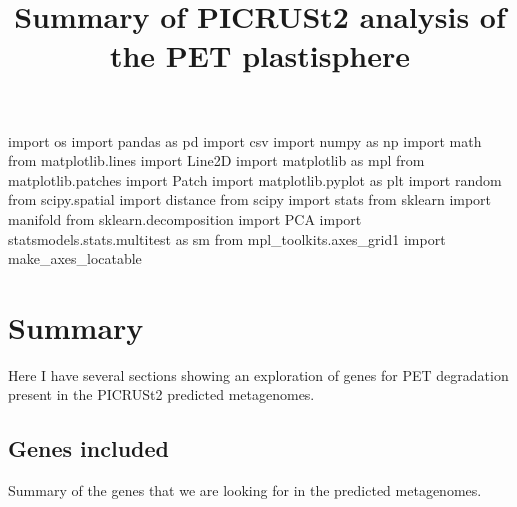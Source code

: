 \documentclass[
]{article}
\title{Summary of PICRUSt2 analysis of the PET plastisphere}
\author{}
\date{\vspace{-2.5em}}
\newenvironment{Shaded}{\begin{snugshade}}{\end{snugshade}}
\newcommand{\ImportTok}[1]{#1}
\newcommand{\NormalTok}[1]{#1}
\begin{document}
\maketitle

{
\setcounter{tocdepth}{2}
\tableofcontents
}
\begin{Shaded}
\begin{Highlighting}[]
\ImportTok{import}\NormalTok{ os}
\ImportTok{import}\NormalTok{ pandas }\ImportTok{as}\NormalTok{ pd}
\ImportTok{import}\NormalTok{ csv}
\ImportTok{import}\NormalTok{ numpy }\ImportTok{as}\NormalTok{ np}
\ImportTok{import}\NormalTok{ math}
\ImportTok{from}\NormalTok{ matplotlib.lines }\ImportTok{import}\NormalTok{ Line2D}
\ImportTok{import}\NormalTok{ matplotlib }\ImportTok{as}\NormalTok{ mpl}
\ImportTok{from}\NormalTok{ matplotlib.patches }\ImportTok{import}\NormalTok{ Patch}
\ImportTok{import}\NormalTok{ matplotlib.pyplot }\ImportTok{as}\NormalTok{ plt}
\ImportTok{import}\NormalTok{ random}
\ImportTok{from}\NormalTok{ scipy.spatial }\ImportTok{import}\NormalTok{ distance}
\ImportTok{from}\NormalTok{ scipy }\ImportTok{import}\NormalTok{ stats}
\ImportTok{from}\NormalTok{ sklearn }\ImportTok{import}\NormalTok{ manifold}
\ImportTok{from}\NormalTok{ sklearn.decomposition }\ImportTok{import}\NormalTok{ PCA}
\ImportTok{import}\NormalTok{ statsmodels.stats.multitest }\ImportTok{as}\NormalTok{ sm}
\ImportTok{from}\NormalTok{ mpl_toolkits.axes_grid1 }\ImportTok{import}\NormalTok{ make_axes_locatable}
\end{Highlighting}
\end{Shaded}

\hypertarget{summary}{%
\section{Summary}\label{summary}}

Here I have several sections showing an exploration of genes for PET
degradation present in the PICRUSt2 predicted metagenomes.

\hypertarget{genes-included}{%
\subsection{Genes included}\label{genes-included}}

Summary of the genes that we are looking for in the predicted
metagenomes.
\end{document}
